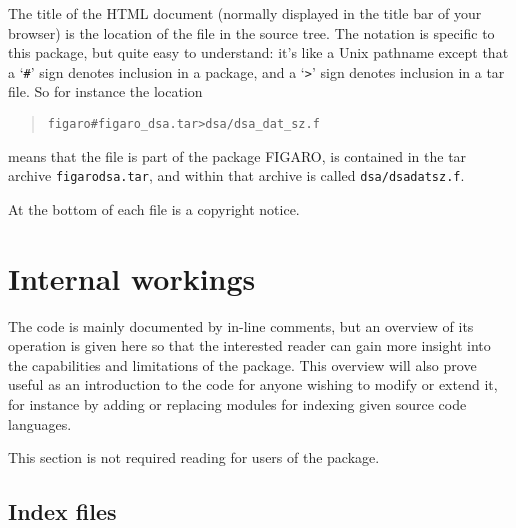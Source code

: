 \documentclass[twoside,11pt]{article}
\newcommand{\xlabel}[1]{}
\renewcommand{\_}{\texttt{\symbol{95}}}
\begin{document}
The title of the HTML document
(normally displayed in the title bar of your browser)
is the location of the file in 
the source tree.  The notation is specific to this package,
but quite easy to understand: 
it's like a Unix pathname except that
a `{\tt \#}' sign denotes inclusion in a package, 
and a 
`\verb|>|'
sign denotes inclusion in a tar file.
So for instance the location
\begin{quote}
\begin{verbatim}
figaro#figaro_dsa.tar>dsa/dsa_dat_sz.f
\end{verbatim}
\end{quote}
means that the file is part of the package FIGARO,
is contained in the tar archive {\tt figaro\_dsa.tar}, and
within that archive is called {\tt dsa/dsa\_dat\_sz.f}.

At the bottom of each file is a copyright notice.


\section{\xlabel{sec:internals}\label{sec:internals}Internal workings}

The code is mainly documented by in-line comments,
but an overview of its operation is given here so 
that the interested reader can gain more insight into
the capabilities and limitations of the package.
This overview will also prove useful as an introduction to
the code for anyone wishing to modify or extend it, 
for instance by adding or replacing modules for indexing 
given source code languages.

This section is not required reading for users of the package.

\subsection{\xlabel{sec:internals-indexes}\label{sec:internals-indexes}Index files}
\end{document}

